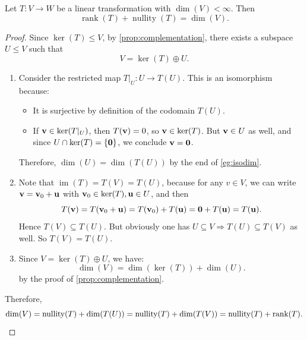 \begin{theorem}
Let \(T : V \rightarrow W\) be a linear transformation with \(\dim(V) < \infty\). Then
\[
\operatorname{rank}(T) + \operatorname{nullity}(T) = \dim(V).
\]
\end{theorem}

\begin{proof}
Since \(\ker(T) \leq V\), by \autoref{prop:complementation}, there exists a subspace \(U \leq V\) such that
\[
V = \ker(T) \oplus U.
\]
\begin{enumerate}
  \item Consider the restricted map \(T|_U : U \rightarrow T(U)\). This is an isomorphism because:
  \begin{itemize}
    \item It is surjective by definition of the codomain \(T(U)\).
    \item If \({\bf v} \in \ker(T|_U)\), then \(T({\bf v}) = 0\), so \({\bf v} \in \ker(T)\). But \({\bf v} \in U\) as well, and since \(U \cap \ker(T) = \{{\bf 0}\}\), we conclude \({\bf v} = {\bf 0}\).
  \end{itemize}
  Therefore, \(\dim(U) = \dim(T(U))\) by the end of \autoref{eg:isodim}.
  
  \item Note that \(\operatorname{im}(T) = T(V) = T(U)\), because for any \(v \in V\), we can write \({\bf v} = {\bf v}_0 + {\bf u}\) with \({\bf v}_0 \in \ker(T), {\bf u} \in U\), and then
  \[
  T({\bf v}) = T({\bf v}_0 + {\bf u}) = T({\bf v}_0) + T({\bf u}) = {\bf 0} + T({\bf u}) = T({\bf u}).
  \]
  Hence \(T(V) \subseteq T(U)\). But obviously one has $U \subseteq V \Rightarrow T(U) \subseteq T(V)$ as well. So $T(V) = T(U)$.
  
  \item Since \(V = \ker(T) \oplus U\), we have:
  \[
  \dim(V) = \dim(\ker(T)) + \dim(U).
  \]
  by the proof of \autoref{prop:complementation}.
\end{enumerate}

Therefore,
\[
\dim(V) = \operatorname{nullity}(T) + \dim(T(U)) = \operatorname{nullity}(T) + \dim(T(V)) = \operatorname{nullity}(T) + \operatorname{rank}(T). \qedhere
\]
\end{proof}